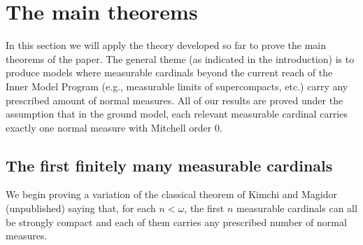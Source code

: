 \documentclass[11pt]{amsart}
\theoremstyle{definition}
\theoremstyle{remark}
\newcommand\<{{<}}
\begin{document}
\section{The main theorems}\label{sec:main section}
In this section we will apply the theory developed so far to prove the main theorems of the paper. The general theme (as indicated in the introduction) is to produce models where measurable cardinals beyond the current reach of the Inner Model Program (e.g., measurable limits of supercompacts, etc.) carry any prescribed amount of normal measures. All of our results are proved under the assumption that in the ground model, each relevant measurable cardinal carries exactly one normal measure with Mitchell order $0$.


\subsection{The first finitely many measurable cardinals}

We begin proving a variation of  the classical theorem of Kimchi and Magidor (unpublished) saying that, for each $n<\omega$, the first $n$ measurable cardinals can all be strongly compact and each of them carries any prescribed number of normal measures. 
\end{document}
